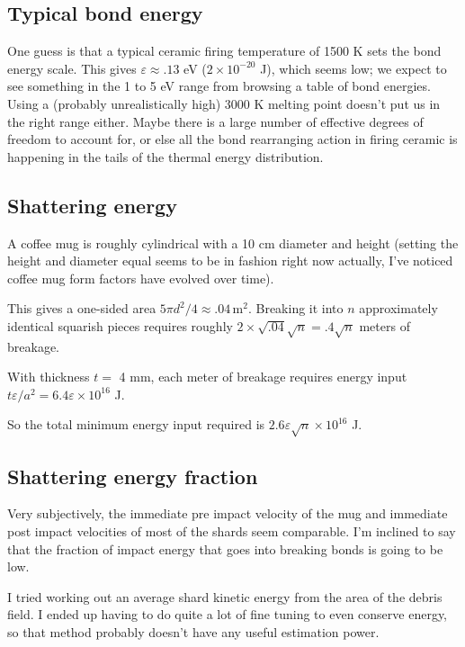 \documentclass[12pt]{article}
\begin{document}
\subsection{Typical bond energy}

One guess is that a typical ceramic firing temperature of 1500 K sets the bond energy scale. This gives \(\varepsilon \approx .13\) eV (\(2\times 10^{-20}\) J), which seems low; we expect to see something in the 1 to 5 eV range from browsing a table of bond energies. Using a (probably unrealistically high) 3000 K melting point doesn't put us in the right range either. Maybe there is a large number of effective degrees of freedom to account for, or else all the bond rearranging action in firing ceramic is happening in the tails of the thermal energy distribution.

\subsection{Shattering energy}

A coffee mug is roughly cylindrical with a 10 cm diameter and height (setting the height and diameter equal seems to be in fashion right now actually, I've noticed coffee mug form factors have evolved over time).



This gives a one-sided area \(5\pi d^2/4 \approx .04 \,\mathrm{m}^2\). Breaking it into \(n\) approximately identical squarish pieces requires roughly \(2\times \sqrt{.04}\sqrt{n} = .4\sqrt{n}\) meters of breakage.

With thickness \(t=\) 4 mm, each meter of breakage requires energy input \(t\varepsilon/a^2 = 6.4 \varepsilon\times 10^{16}\) J.

So the total minimum energy input required is \(2.6\varepsilon\sqrt{n} \times 10^{16}\) J.

\subsection{Shattering energy fraction}

Very subjectively, the immediate pre impact velocity of the mug and immediate post impact velocities of most of the shards seem comparable. I'm inclined to say that the fraction of impact energy that goes into breaking bonds is going to be low. 

I tried working out an average shard kinetic energy from the area of the debris field. I ended up having to do quite a lot of fine tuning to even conserve energy, so that method probably doesn't have any useful estimation power.
\end{document}

